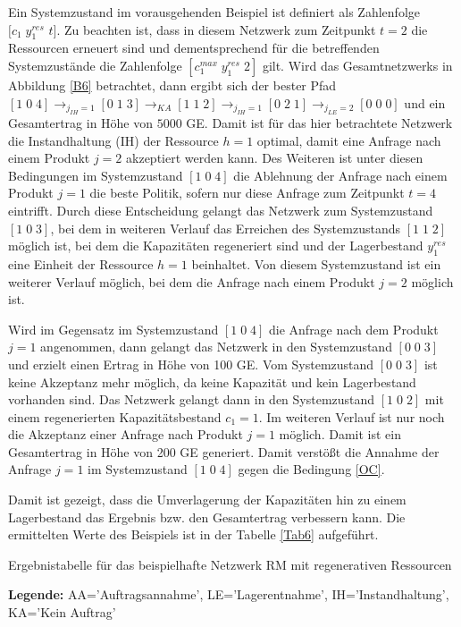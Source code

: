 Ein Systemzustand im vorausgehenden Beispiel ist definiert als Zahlenfolge $[c_1\;y^{res}_1$ $t]$. Zu beachten ist, dass in diesem Netzwerk zum Zeitpunkt $t=2$ die Ressourcen erneuert sind und dementsprechend für die betreffenden Systemzustände die Zahlenfolge $[c_1^{max}\;y^{res}_1\;2]$ gilt. Wird das Gesamtnetzwerks in Abbildung \ref{B6} betrachtet, dann ergibt sich der bester Pfad $[1\;0\;4] \rightarrow_{j_{IH}=1} [0\;1\;3] \rightarrow_{KA} [1\;1\;2] \rightarrow_{j_{IH}=1} [0\;2\;1] \rightarrow_{j_{LE}=2} [0\;0\;0]$ und ein Gesamtertrag in Höhe von $5000$ GE. Damit ist für das hier betrachtete Netzwerk die Instandhaltung (IH) der Ressource $h=1$ optimal, damit eine Anfrage nach einem Produkt $j=2$ akzeptiert werden kann. Des Weiteren ist unter diesen Bedingungen im Systemzustand $[1\;0\;4]$ die Ablehnung der Anfrage nach einem Produkt $j=1$ die beste Politik, sofern nur diese Anfrage zum Zeitpunkt $t=4$ eintrifft. Durch diese Entscheidung gelangt das Netzwerk zum Systemzustand $[1\;0\;3]$, bei dem in weiteren Verlauf das Erreichen des Systemzustands $[1\;1\;2]$ möglich ist, bei dem die Kapazitäten regeneriert sind und der Lagerbestand $y_1^{res}$ eine Einheit der Ressource $h=1$ beinhaltet. Von diesem Systemzustand ist ein weiterer Verlauf möglich, bei dem die Anfrage nach einem Produkt $j=2$ möglich ist.

Wird im Gegensatz im Systemzustand $[1\;0\;4]$ die Anfrage nach dem Produkt $j=1$ angenommen, dann gelangt das Netzwerk in den Systemzustand $[0\;0\;3]$ und erzielt einen Ertrag in Höhe von 100 GE. Vom Systemzustand $[0\;0\;3]$ ist keine Akzeptanz mehr möglich, da keine Kapazität und kein Lagerbestand vorhanden sind. Das Netzwerk gelangt dann in den Systemzustand $[1\;0\;2]$ mit einem regenerierten Kapazitätsbestand $c_1=1$. Im weiteren Verlauf ist nur noch die Akzeptanz einer Anfrage nach Produkt $j=1$ möglich. Damit ist ein Gesamtertrag in Höhe von 200 GE generiert. Damit verstößt die Annahme der Anfrage $j=1$ im Systemzustand $[1\;0\;4]$ gegen die Bedingung \eqref{OC}.

Damit ist gezeigt, dass die Umverlagerung der Kapazitäten hin zu einem Lagerbestand das Ergebnis bzw. den Gesamtertrag verbessern kann. Die ermittelten Werte des Beispiels ist in der Tabelle \ref{Tab6} aufgeführt.

\begin{table}
\begin{footnotesize}
    \caption{Ergebnistabelle für das beispielhafte Netzwerk RM mit regenerativen Ressourcen} \label{Tab6}
    \vspace*{3mm}
        \begin{center}
      \end{center}
    \begin{center}
      {\footnotesize \textbf{Legende:} AA='Auftragsannahme', LE='Lagerentnahme', IH='Instandhaltung', KA='Kein Auftrag'} 
      \end{center}
\end{footnotesize}
\end{table}

